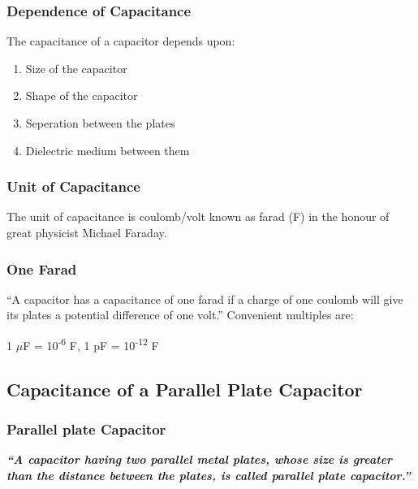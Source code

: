 \subsubsection*{Dependence of Capacitance}
The capacitance of a capacitor depends upon:
\begin{enumerate}[label = (\roman*)]
\item Size of the capacitor
\item Shape of the capacitor
\item Seperation between the plates 
\item Dielectric medium between them 
\end{enumerate}
\subsubsection{Unit of Capacitance}
The unit of capacitance is coulomb/volt known as farad (F)
in the honour of great physicist Michael Faraday.
\subsubsection{One Farad}
“A capacitor has a capacitance of one farad if a charge of one coulomb
will give its plates a potential difference of one volt.”
Convenient multiples are:
\begin{center}
  1 $\mu$F = 10\textsuperscript{-6} F, 1 pF = 10\textsuperscript{-12} F 
\end{center}
\subsection{Capacitance of a Parallel Plate Capacitor}
\subsubsection{Parallel plate Capacitor}
\textit{\textbf{“A capacitor having two parallel metal plates,
whose size is greater than the distance between the plates,
is called parallel plate capacitor.”}}
